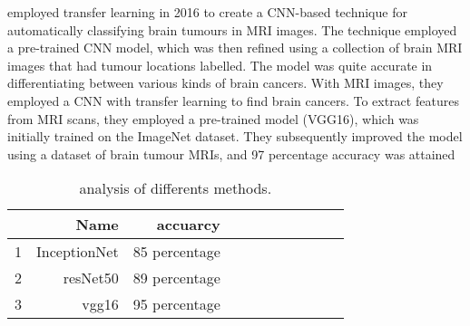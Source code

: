 employed transfer learning in 2016 to create a CNN-based
technique for automatically classifying brain tumours in MRI
images. The technique employed a pre-trained CNN model,
which was then refined using a collection of brain MRI
images that had tumour locations labelled. The model was
quite accurate in differentiating between various kinds of
brain cancers. With MRI images, they employed a CNN with
transfer learning to find brain cancers. To extract features from
MRI scans, they employed a pre-trained model (VGG16),
which was initially trained on the ImageNet dataset. They
subsequently improved the model using a dataset of brain
tumour MRIs, and 97 percentage accuracy was attained
\begin{table}[H]
    \centering
    \caption{\small analysis of differents methods.}
   \scriptsize
    \begin{tabular}{lrrrrrrrrrr}
\toprule
{} &  \small Name  &  \small accuarcy   \\

\midrule
1 &    InceptionNet  &    85 percentage   \\
2 &    resNet50  &    89 percentage  \\
3 &    vgg16  &   95 percentage\\

\bottomrule
\end{tabular}
    
    \label{fig:posterior}
\end{table}